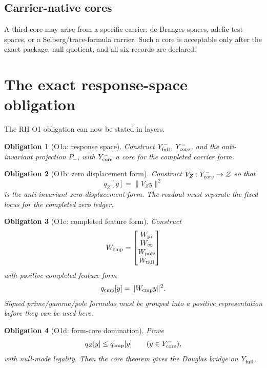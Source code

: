 \documentclass[11pt]{article}
\newtheorem{obligation}{Obligation}
\newcommand{\Yfull}{Y^-_{\rm full}}
\newcommand{\Ycore}{Y^-_{\rm core}}
\begin{document}
\subsection{Carrier-native cores}
A third core may arise from a specific carrier: de Branges spaces, adelic test spaces, or a Selberg/trace-formula carrier.  Such a core is acceptable only after the exact package, null quotient, and all-six records are declared.

\section{The exact response-space obligation}
The RH O1 obligation can now be stated in layers.

\begin{obligation}[O1a: response space]
Construct \(\Yfull\), \(\Ycore\), and the anti-invariant projection \(P_-\), with \(\Ycore\) a core for the completed carrier form.
\end{obligation}

\begin{obligation}[O1b: zero displacement form]
Construct \(V_Z:\Ycore\to\mathcal Z\) so that
\[
  q_Z[y]=\|V_Zy\|^2
\]
is the anti-invariant zero-displacement form.  The readout must separate the fixed locus for the completed zero ledger.
\end{obligation}

\begin{obligation}[O1c: completed feature form]
Construct
\[
  W_{\rm cmp}=\begin{bmatrix}W_{\rm pr}\\ W_\infty\\ W_{\rm pole}\\ W_{\rm tail}\end{bmatrix}
\]
with positive completed feature form
\[
  q_{\rm cmp}[y]=\|W_{\rm cmp}y\|^2.
\]
Signed prime/gamma/pole formulas must be grouped into a positive representation before they can be used here.
\end{obligation}

\begin{obligation}[O1d: form-core domination]
Prove
\[
  q_Z[y]\le q_{\rm cmp}[y]
  \qquad (y\in\Ycore),
\]
with null-mode legality.  Then the core theorem gives the Douglas bridge on \(\Yfull\).
\end{obligation}
\end{document}
